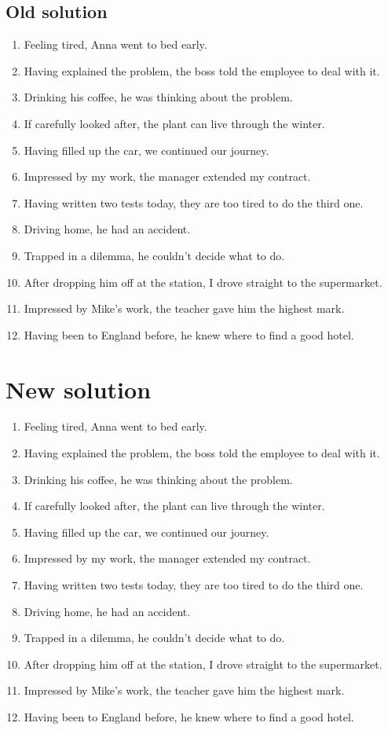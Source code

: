 \subsection*{Old solution}
\begin{enumerate}
      \item Feeling tired, Anna went to bed early.
      \item Having explained the problem, the boss told the employee to deal with it.
      \item Drinking his coffee, he was thinking about the problem.
      \item If carefully looked after, the plant can live through the winter.
      \item Having filled up the car, we continued our journey.
      \item Impressed by my work, the manager extended my contract.
      \item Having written two tests today, they are too tired to do the third one.
      \item Driving home, he had an accident.
      \item Trapped in a dilemma, he couldn’t decide what to do.
      \item After dropping him off at the station, I drove straight to the supermarket.
      \item Impressed by Mike’s work, the teacher gave him the highest mark.
      \item Having been to England before, he knew where to find a good hotel.
\end{enumerate}

\section*{New solution}
\begin{enumerate}
      \item Feeling tired, Anna went to bed early.
      \item Having explained the problem, the boss told the employee to deal with it.
      \item Drinking his coffee, he was thinking about the problem.
      \item If carefully looked after, the plant can live through the winter.
      \item Having filled up the car, we continued our journey.
      \item Impressed by my work, the manager extended my contract.
      \item Having written two tests today, they are too tired to do the third one.
      \item Driving home, he had an accident.
      \item Trapped in a dilemma, he couldn’t decide what to do.
      \item After dropping him off at the station, I drove straight to the supermarket.
      \item Impressed by Mike’s work, the teacher gave him the highest mark.
      \item Having been to England before, he knew where to find a good hotel.
\end{enumerate}

